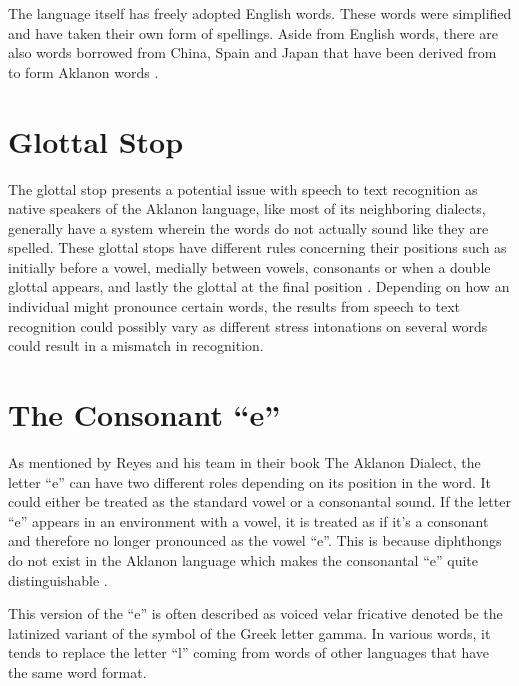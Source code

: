 The language itself has freely adopted English words. These words were simplified and have taken their own form of spellings. Aside from English words, there are also words borrowed from China, Spain and Japan that have been derived from to form Aklanon words \cite{salas1969study}. 

\section{Glottal Stop}

The glottal stop presents a potential issue with speech to text recognition as native speakers of the Aklanon language, like most of its neighboring dialects, generally have a system wherein the words do not actually sound like they are spelled. These glottal stops have different rules concerning their positions such as initially before a vowel, medially between vowels, consonants or when a double glottal appears, and lastly the glottal at the final position \cite{salas1969study}. Depending on how an individual might pronounce certain words, the results from speech to text recognition could possibly vary as different stress intonations on several words could result in a mismatch in recognition.

\section{The Consonant “e”}
As mentioned by Reyes and his team in their book The Aklanon Dialect, the letter “e” can have two different roles depending on its position in the word. It could either be treated as the standard vowel or a consonantal sound. If the letter “e” appears in an environment with a vowel, it is treated as if it’s a consonant and therefore no longer pronounced as the vowel “e”. This is because diphthongs do not exist in the Aklanon language which makes the consonantal “e” quite distinguishable \cite{salas1969study}.

This version of the “e” is often described as voiced velar fricative denoted be the latinized variant of the symbol of the Greek letter gamma. In various words, it tends to replace the letter “l” coming from words of other languages that have the same word format.
